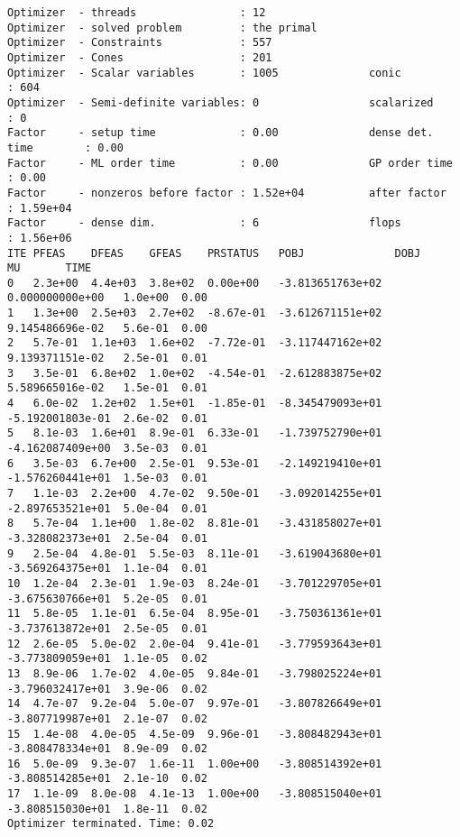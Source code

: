 \documentclass[
  10pt,
  a4paper,
,tablecaptionabove
]{scrartcl}
\begin{document}
\begin{verbatim}
Optimizer  - threads                : 12              
Optimizer  - solved problem         : the primal      
Optimizer  - Constraints            : 557
Optimizer  - Cones                  : 201
Optimizer  - Scalar variables       : 1005              conic                  : 604             
Optimizer  - Semi-definite variables: 0                 scalarized             : 0               
Factor     - setup time             : 0.00              dense det. time        : 0.00            
Factor     - ML order time          : 0.00              GP order time          : 0.00            
Factor     - nonzeros before factor : 1.52e+04          after factor           : 1.59e+04        
Factor     - dense dim.             : 6                 flops                  : 1.56e+06        
ITE PFEAS    DFEAS    GFEAS    PRSTATUS   POBJ              DOBJ              MU       TIME  
0   2.3e+00  4.4e+03  3.8e+02  0.00e+00   -3.813651763e+02  0.000000000e+00   1.0e+00  0.00  
1   1.3e+00  2.5e+03  2.7e+02  -8.67e-01  -3.612671151e+02  9.145486696e-02   5.6e-01  0.00  
2   5.7e-01  1.1e+03  1.6e+02  -7.72e-01  -3.117447162e+02  9.139371151e-02   2.5e-01  0.01  
3   3.5e-01  6.8e+02  1.0e+02  -4.54e-01  -2.612883875e+02  5.589665016e-02   1.5e-01  0.01  
4   6.0e-02  1.2e+02  1.5e+01  -1.85e-01  -8.345479093e+01  -5.192001803e-01  2.6e-02  0.01  
5   8.1e-03  1.6e+01  8.9e-01  6.33e-01   -1.739752790e+01  -4.162087409e+00  3.5e-03  0.01  
6   3.5e-03  6.7e+00  2.5e-01  9.53e-01   -2.149219410e+01  -1.576260441e+01  1.5e-03  0.01  
7   1.1e-03  2.2e+00  4.7e-02  9.50e-01   -3.092014255e+01  -2.897653521e+01  5.0e-04  0.01  
8   5.7e-04  1.1e+00  1.8e-02  8.81e-01   -3.431858027e+01  -3.328082373e+01  2.5e-04  0.01  
9   2.5e-04  4.8e-01  5.5e-03  8.11e-01   -3.619043680e+01  -3.569264375e+01  1.1e-04  0.01  
10  1.2e-04  2.3e-01  1.9e-03  8.24e-01   -3.701229705e+01  -3.675630766e+01  5.2e-05  0.01  
11  5.8e-05  1.1e-01  6.5e-04  8.95e-01   -3.750361361e+01  -3.737613872e+01  2.5e-05  0.01  
12  2.6e-05  5.0e-02  2.0e-04  9.41e-01   -3.779593643e+01  -3.773809059e+01  1.1e-05  0.02  
13  8.9e-06  1.7e-02  4.0e-05  9.84e-01   -3.798025224e+01  -3.796032417e+01  3.9e-06  0.02  
14  4.7e-07  9.2e-04  5.0e-07  9.97e-01   -3.807826649e+01  -3.807719987e+01  2.1e-07  0.02  
15  1.4e-08  4.0e-05  4.5e-09  9.96e-01   -3.808482943e+01  -3.808478334e+01  8.9e-09  0.02  
16  5.0e-09  9.3e-07  1.6e-11  1.00e+00   -3.808514392e+01  -3.808514285e+01  2.1e-10  0.02  
17  1.1e-09  8.0e-08  4.1e-13  1.00e+00   -3.808515040e+01  -3.808515030e+01  1.8e-11  0.02  
Optimizer terminated. Time: 0.02    
\end{verbatim}
\end{document}
